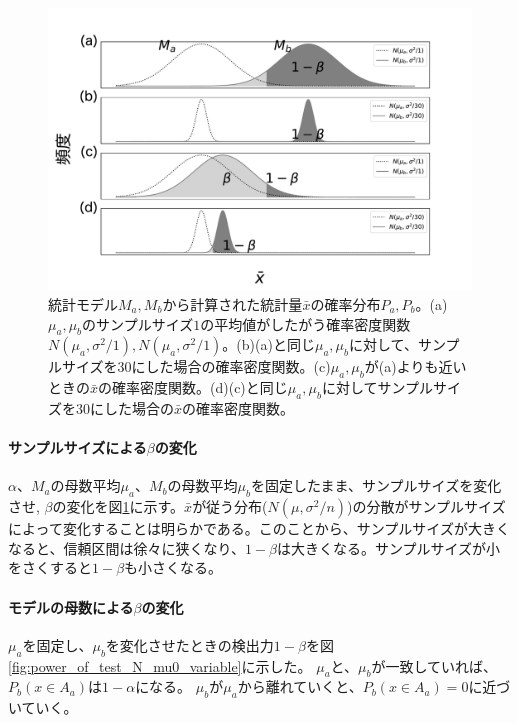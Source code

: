 \begin{figure}
    \begin{center}
        \includegraphics[width=15cm]{./image/04_/power_of_a_test_3.pdf}
        \caption{統計モデル$M_a,M_b$から計算された統計量$\bar{x}$の確率分布$P_a,P_b$。(a)$\mu_a,\mu_b$のサンプルサイズ$1$の平均値がしたがう確率密度関数$N(\mu_a,\sigma^2/1),N(\mu_a,\sigma^2/1)$。(b)(a)と同じ$\mu_a,\mu_b$に対して、サンプルサイズを$30$にした場合の確率密度関数。(c)$\mu_a,\mu_b$が(a)よりも近いときの$\bar{x}$の確率密度関数。(d)(c)と同じ$\mu_a,\mu_b$に対してサンプルサイズを$30$にした場合の$\bar{x}$の確率密度関数。}
        \label{fig:power_of_test_alpha_beta_sample_size}
    \end{center}
    \end{figure}

\paragraph{サンプルサイズによる$\beta$の変化}

$\alpha$、$M_a$の母数平均$\mu_a$、$M_b$の母数平均$\mu_b$を固定したまま、サンプルサイズを変化させ,
$\beta$の変化を図\ref{fig:power_of_test_alpha_beta_sample_size}に示す。$\bar{x}$が従う分布($N(\mu,\sigma^2/n)$)の分散がサンプルサイズによって変化することは明らかである。このことから、サンプルサイズが大きくなると、信頼区間は徐々に狭くなり、$1-\beta$は大きくなる。サンプルサイズが小をさくすると$1-\beta$も小さくなる。

\paragraph{モデルの母数による$\beta$の変化}
$\mu_a$を固定し、$\mu_b$を変化させたときの検出力$1-\beta$を図\ref{fig:power_of_test_N_mu0_variable}に示した。
$\mu_a$と、$\mu_b$が一致していれば、$P_b(x \in A_a )$は$1-\alpha$になる。
$\mu_b$が$\mu_a$から離れていくと、$P_b(x \in A_a)=0$に近づいていく。

